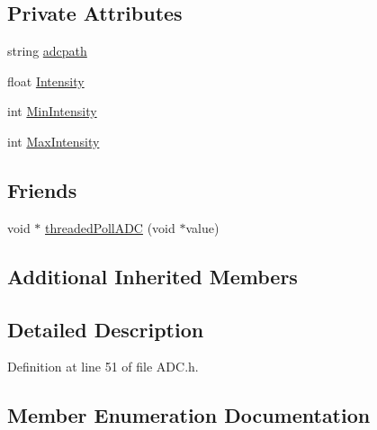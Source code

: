 \subsection*{Private Attributes}
\begin{DoxyCompactItemize}
\item 
string \hyperlink{class_hardware_1_1_a_d_c_a820ce4f097a70b95246049f9ea01df21}{adcpath}
\item 
float \hyperlink{class_hardware_1_1_a_d_c_a38a0f00558a3de01b3bce567643dae4a}{Intensity}
\item 
int \hyperlink{class_hardware_1_1_a_d_c_af73224014dddfdd80f77b80e6ed82c13}{Min\+Intensity}
\item 
int \hyperlink{class_hardware_1_1_a_d_c_a8fb4ac4b41ff54a44e57e9ce8bc5bd93}{Max\+Intensity}
\end{DoxyCompactItemize}
\subsection*{Friends}
\begin{DoxyCompactItemize}
\item 
void $\ast$ \hyperlink{class_hardware_1_1_a_d_c_a626f06adb6721fc5fe0aa7f76a770770}{threaded\+Poll\+A\+D\+C} (void $\ast$value)
\end{DoxyCompactItemize}
\subsection*{Additional Inherited Members}


\subsection{Detailed Description}


Definition at line 51 of file A\+D\+C.\+h.



\subsection{Member Enumeration Documentation}
\hypertarget{class_hardware_1_1_a_d_c_adb1507998c096cbdf7031527f6a690cf}{}
